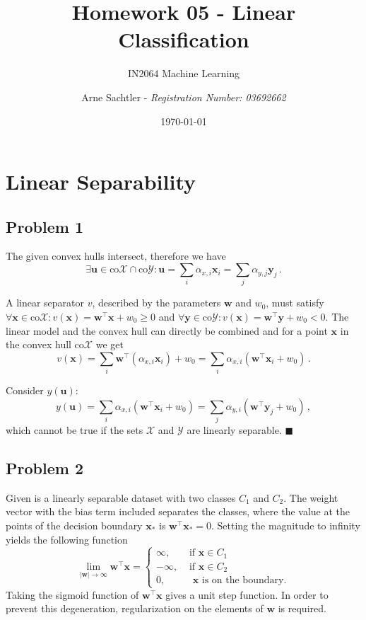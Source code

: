 \documentclass{scrartcl}
\title{Homework 05 - Linear Classification}
\author{Arne Sachtler - \textit{Registration Number: 03692662}}
\date{\today}
\subtitle{IN2064 Machine Learning}
\newcommand{\qed}{\hfill $\blacksquare$}
\begin{document}
\maketitle

\section{Linear Separability}
\subsection{Problem 1}

The given convex hulls intersect, therefore we have 
\begin{equation}
	\exists \mathbf{u} \in \text{co}\mathcal{X} \cap \text{co}\mathcal{Y} : \mathbf{u} = \sum_i \alpha_{x,i} \mathbf{x}_i = \sum_j \alpha_{y,j} \mathbf{y}_j \, .
\end{equation}

A linear separator $v$, described by the parameters $\mathbf{w}$ and $w_0$, must satisfy $\forall \mathbf{x} \in \text{co}\mathcal{X}: v(\mathbf{x}) = \mathbf{w}^\top \mathbf{x}+ w_0 \ge 0$ and  $\forall \mathbf{y} \in \text{co} \mathcal{Y}: v(\mathbf{x}) = \mathbf{w}^\top \mathbf{y} + w_0 < 0$.
The linear model and the convex hull can directly be combined and for a point $\mathbf{x}$ in the convex hull $\text{co}\mathcal{X}$ we get
\begin{equation}
	v(\mathbf{x}) = \sum_i \mathbf{w}^\top (\alpha_{x,i} \mathbf{x}_i) + w_0 = \sum_i \alpha_{x,i} \left(\mathbf{w}^\top \mathbf{x}_i + w_0\right) \, .
\end{equation}

Consider $y(\mathbf{u})$:
\begin{equation}
	y(\mathbf{u}) = \sum_i \alpha_{x,i} \left(\mathbf{w}^\top \mathbf{x}_i + w_0\right)= \sum_j \alpha_{y,i} \left(\mathbf{w}^\top \mathbf{y}_j + w_0\right) \, ,
\end{equation}
which cannot be true if the sets $\mathcal{X}$ and $\mathcal{Y}$ are linearly separable. \qed

\subsection{Problem 2}
Given is a linearly separable dataset with two classes $C_1$ and $C_2$. The weight vector with the bias term included separates the classes, where the value at the points of the decision boundary $\mathbf{x}_{*}$ is $\mathbf{w}^\top \mathbf{x}_* = 0$. Setting the magnitude to infinity yields the following function
\begin{equation}
	\lim_{|\mathbf{w}| \rightarrow \infty} \mathbf{w}^\top \mathbf{x} = \begin{cases}
		\infty, &\text{ if }\mathbf{x} \in C_1\\
		-\infty, &\text{ if }\mathbf{x} \in C_2\\
		0, &\text{ }\mathbf{x}\text{ is on the boundary.}
	\end{cases}
\end{equation}
Taking the sigmoid function of $\mathbf{w}^\top \mathbf{x}$ gives a unit step function.
In order to prevent this degeneration, regularization on the elements of $\mathbf{w}$ is required.
\end{document}
